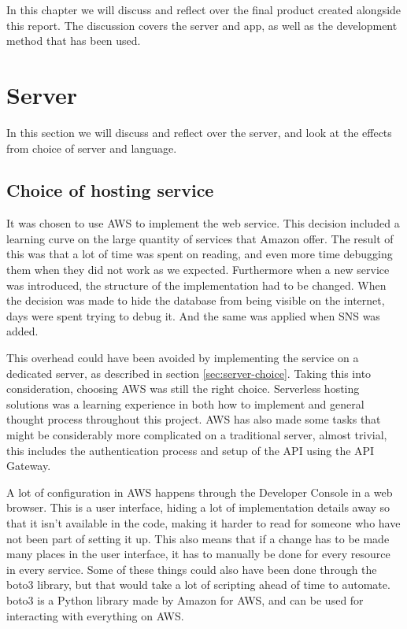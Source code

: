 In this chapter we will discuss and reflect over the final product created alongside this report. The discussion covers the server and app, as well as the development method that has been used.

\section{Server}

In this section we will discuss and reflect over the server, and look at the effects from choice of server and language.

\subsection{Choice of hosting service}
It was chosen to use AWS to implement the web service. This decision included a learning curve on the large quantity of services that Amazon offer. The result of this was that a lot of time was spent on reading, and even more time debugging them when they did not work as we expected. Furthermore when a new service was introduced, the structure of the implementation had to be changed. When the decision was made to hide the database from being visible on the internet, days were spent trying to debug it. And the same was applied when SNS was added.

This overhead could have been avoided by implementing the service on a dedicated server, as described in section \ref{sec:server-choice}. Taking this into consideration, choosing AWS was still the right choice. Serverless hosting solutions was a learning experience in both how to implement and general thought process throughout this project. AWS has also made some tasks that might be considerably more complicated on a traditional server, almost trivial, this includes the authentication process and setup of the API using the API Gateway.

A lot of configuration in AWS happens through the Developer Console in a web browser. This is a user interface, hiding a lot of implementation details away so that it isn't available in the code, making it harder to read for someone who have not been part of setting it up. This also means that if a change has to be made many places in the user interface, it has to manually be done for every resource in every service. Some of these things could also have been done through the boto3 library, but that would take a lot of scripting ahead of time to automate. boto3 is a Python library made by Amazon for AWS, and can be used for interacting with everything on AWS.

